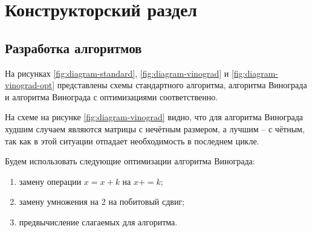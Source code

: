\section{Конструкторский раздел \hfill}
\vspace{\baselineskip}

\subsection{Разработка алгоритмов}

На рисунках  \ref{fig:diagram-standard}, \ref{fig:diagram-vinograd} и \ref{fig:diagram-vinograd-opt} представлены схемы стандартного алгоритма, алгоритма Винограда и алгоритма Винограда с оптимизациями соответственно.

На схеме на рисунке \ref{fig:diagram-vinograd} видно, что для алгоритма Винограда худшим случаем являются матрицы с нечётным размером, а лучшим -- с чётным, так как в этой ситуации отпадает необходимость в последнем цикле.

Будем использовать следующие оптимизации алгоритма Винограда:
\begin{enumerate}
    \item замену операции $x = x + k$ на $x += k$;
    \item замену умножения на 2 на побитовый сдвиг;
    \item предвычисление слагаемых для алгоритма.
\end{enumerate}
\newpage

